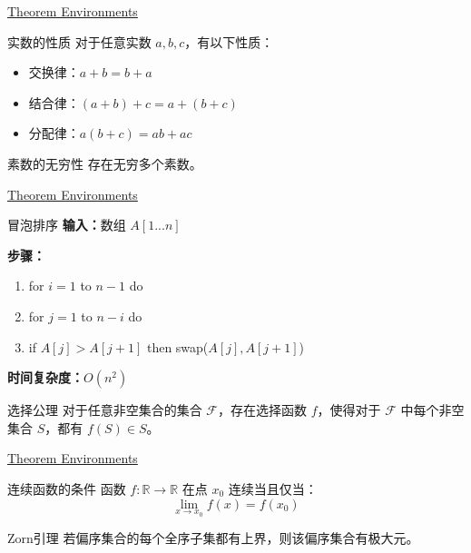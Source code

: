 \documentclass[11pt,aspectratio=43,xcolor={dvipsnames},hyperref={pdftex,pdfpagemode=UseNone,hidelinks,pdfdisplaydoctitle=true},usepdftitle=false]{ctexbeamer}
\begin{document}
\begin{frame}{\underline{Theorem Environments}}
  \begin{chdproperty}{实数的性质}
    对于任意实数 $a, b, c$，有以下性质：
    \begin{itemize}
      \item 交换律：$a + b = b + a$
      \item 结合律：$(a + b) + c = a + (b + c)$
      \item 分配律：$a(b + c) = ab + ac$
    \end{itemize}
  \end{chdproperty}
  \begin{chdproposition}{素数的无穷性}
    存在无穷多个素数。
  \end{chdproposition}
\end{frame}

\begin{frame}{\underline{Theorem Environments}}
  \begin{chdalgorithm}{冒泡排序}
    \textbf{输入：}数组 $A[1...n]$
    
    \textbf{步骤：}
    \begin{enumerate}
      \item for $i = 1$ to $n-1$ do
      \item \quad for $j = 1$ to $n-i$ do
      \item \quad\quad if $A[j] > A[j+1]$ then swap($A[j], A[j+1]$)
    \end{enumerate}
    
    \textbf{时间复杂度：}$O(n^2)$
  \end{chdalgorithm}
  \begin{chdaxiom}{选择公理}
    对于任意非空集合的集合 $\mathcal{F}$，存在选择函数 $f$，使得对于 $\mathcal{F}$ 中每个非空集合 $S$，都有 $f(S) \in S$。
  \end{chdaxiom}
\end{frame}

\begin{frame}{\underline{Theorem Environments}}
  \begin{chdcondition}{连续函数的条件}
    函数 $f: \mathbb{R} \to \mathbb{R}$ 在点 $x_0$ 连续当且仅当：
    $$\lim_{x \to x_0} f(x) = f(x_0)$$
  \end{chdcondition}
  \begin{chdlemma}{Zorn引理}
    若偏序集合的每个全序子集都有上界，则该偏序集合有极大元。
  \end{chdlemma}
\end{frame}
\end{document}
